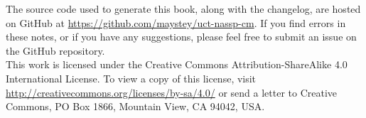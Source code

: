 The source code used to generate this book, along with the changelog, are hosted on GitHub at \url{https://github.com/maystey/uct-nassp-cm}. If you find errors in these notes, or if you have any suggestions, please feel free to submit an issue on the GitHub repository.\\

This work is licensed under the Creative Commons Attribution-ShareAlike 4.0 International License. To view a copy of this license, visit \url{http://creativecommons.org/licenses/by-sa/4.0/} or send a letter to Creative Commons, PO Box 1866, Mountain View, CA 94042, USA.







